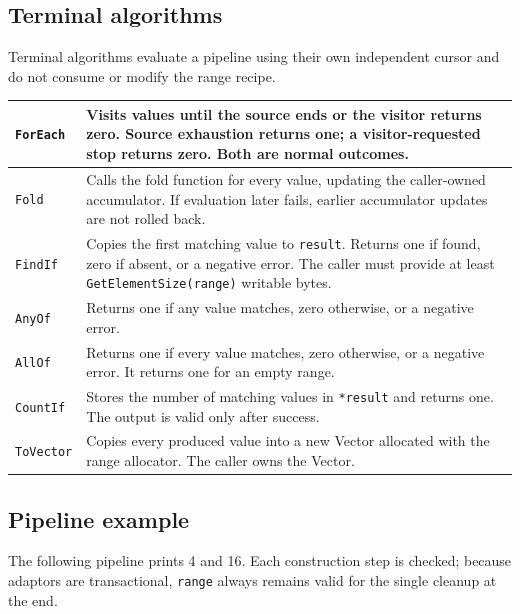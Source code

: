 \subsection{Terminal algorithms}

Terminal algorithms evaluate a pipeline using their own independent cursor
and do not consume or modify the range recipe.

\begin{center}
\begin{tabular}{|l|p{10.2cm}|}
\hline
\verb|ForEach| & Visits values until the source ends or the visitor returns
zero.  Source exhaustion returns one; a visitor-requested stop returns zero.
Both are normal outcomes. \\\hline
\verb|Fold| & Calls the fold function for every value, updating the
caller-owned accumulator.  If evaluation later fails, earlier accumulator
updates are not rolled back. \\\hline
\verb|FindIf| & Copies the first matching value to \verb|result|.  Returns one
if found, zero if absent, or a negative error.  The caller must provide at
least \verb|GetElementSize(range)| writable bytes. \\\hline
\verb|AnyOf| & Returns one if any value matches, zero otherwise, or a negative
error. \\\hline
\verb|AllOf| & Returns one if every value matches, zero otherwise, or a
negative error.  It returns one for an empty range. \\\hline
\verb|CountIf| & Stores the number of matching values in \verb|*result| and
returns one.  The output is valid only after success. \\\hline
\verb|ToVector| & Copies every produced value into a new Vector allocated with
the range allocator.  The caller owns the Vector. \\\hline
\end{tabular}
\end{center}

\subsection{Pipeline example}

The following pipeline prints 4 and 16.  Each construction step is checked;
because adaptors are transactional, \verb|range| always remains valid for the
single cleanup at the end.

